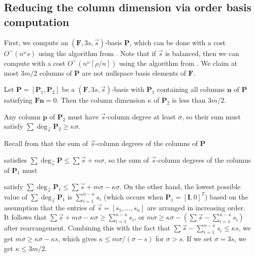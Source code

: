 \begin{comment}
Let us first assume $m\le n\le3m$. Let $s=\xi/n$ be the average
of the entries of $\vec{s}$. 
\end{comment}
{} 


\subsection{\label{sub:continueComputingNullspaceBasisByColumns}Reducing the
column dimension via order basis computation}

First, we compute an $\left(\mathbf{F},3s,\vec{s}\right)$-basis $\mathbf{P}$,
which can be done with a cost $O^{\sim}\left(n^{\omega}s\right)$
using the algorithm from \citet{Giorgi2003}. Note that if $\vec{s}$
is balanced, then we can compute with a cost $O^{\sim}\left(n^{\omega}\left\lceil \rho/n\right\rceil \right)$
using the algorithm from \textbf{\citet{za2009}}. We claim at most
$3m/2$ columns of \textbf{$\mathbf{P}$} are not nullspace basis
elements of $\mathbf{F}$.
\begin{lem}
\label{lem:dimensionOfPartialNullspaceBasisBasedOnOrder} Let $\mathbf{P}=[\mathbf{P}_{1},\mathbf{P}_{2}]$
be a $(\mathbf{F},3s,\vec{s})$-basis with $\mathbf{P}_{1}$ containing
all columns $\mathbf{n}$ of $\mathbf{P}$ satisfying $\mathbf{F}\mathbf{n}=0$.
Then the column dimension $\kappa$ of $\mathbf{P}_{2}$ is less than
$3m/2.$\end{lem}
\begin{pf}
Any column $\mathbf{p}$ of $\mathbf{P}_{2}$ must have $\vec{s}$-column
degree at least $\sigma$, so their sum must satisfy $\sum\deg_{\vec{s}}\mathbf{P}_{2}\ge\kappa\sigma$.
\begin{comment}
$\sum_{i=n-k+1}^{n}s_{i}$ must be at least $k\sigma$
\end{comment}
{} Recall from 
that the sum of $\vec{s}$-column degrees of the columns of $\mathbf{P}$
\begin{comment}
is at most 
\end{comment}
{} satisfies $\sum\deg_{\vec{s}}\mathbf{P}\le\sum\vec{s}+m\sigma$,
so the sum of $\vec{s}$-column degrees of the columns of $\mathbf{P}_{1}$
must %
\begin{comment}
be at most
\end{comment}
{} satisfy $\sum\deg_{\vec{s}}\mathbf{P}_{1}\le\sum\vec{s}+m\sigma-\kappa\sigma$.
On the other hand, the lowest possible value of $\sum\deg_{\vec{s}}\mathbf{P}_{1}$
is $\sum_{i=1}^{n-\kappa}s_{i}$ (which occurs when $\mathbf{P}_{1}=\left[\mathbf{I},0\right]^{T}$)
based on the assumption that the entries of $\vec{s}=\left[s_{1},\dots,s_{n}\right]$
are arranged in increasing order. It follows that $\sum\vec{s}+m\sigma-\kappa\sigma\ge\sum_{i=1}^{n-\kappa}s_{i}$,
or $m\sigma\ge\kappa\sigma-\left(\sum\vec{s}-\sum_{i=1}^{n-\kappa}s_{i}\right)$
after rearrangement. Combining this with the fact that $\sum\vec{s}-\sum_{i=1}^{n-\kappa}s_{i}\le\kappa s$,
we get $m\sigma\ge\kappa\sigma-\kappa s$, which gives $\kappa\le m\sigma/(\sigma-s)$
for $\sigma>s$. If we set $\sigma=3s$, we get $\kappa\le3m/2$.
\end{pf}

